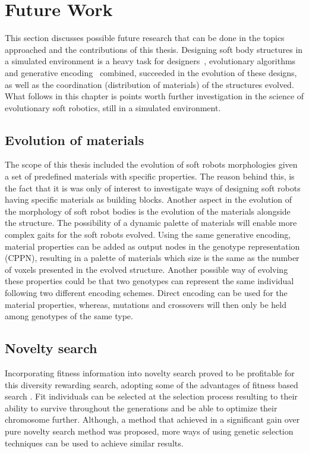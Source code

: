 \section{Future Work} %

This section discusses possible future research that can be done in the topics approached and the contributions of this thesis. Designing soft body structures in a simulated environment is a heavy task for designers~\citep{cheney2013unshackling}, evolutionary algorithms~\citep{stanley2002evolving} and generative encoding~\citep{stanley2007compositional} combined, succeeded in the evolution of these designs, as well as the coordination (distribution of materials) of the structures evolved. What follows in this chapter is points worth further investigation in the science of evolutionary soft robotics, still in a simulated environment.

\subsection*{Evolution of materials}
The scope of this thesis included the evolution of soft robots morphologies given a set of predefined materials with specific properties. The reason behind this, is the fact that it is was only of interest to investigate ways of designing soft robots having specific materials as building blocks. Another aspect in the evolution of the morphology of soft robot bodies is the evolution of the materials alongside the structure. The possibility of a dynamic palette of materials will enable more complex gaits for the soft robots evolved. Using the same generative encoding, material properties can be added as output nodes in the genotype representation (CPPN), resulting in a palette of materials which size is the same as the number of voxels presented in the evolved structure. Another possible way of evolving these properties could be that two genotypes can represent the same individual following two different encoding schemes. Direct encoding can be used for the material properties, whereas, mutations and crossovers will then only be held among genotypes of the same type.

\subsection*{Novelty search}
Incorporating fitness information into novelty search proved to be profitable for this diversity rewarding search, adopting some of the advantages of fitness based search . Fit individuals can be selected at the selection process resulting to their ability to survive throughout the generations and be able to optimize their chromosome further. Although, a method  that achieved in a significant gain over pure novelty search method was proposed, more ways of using genetic selection techniques can be used to achieve similar results.

